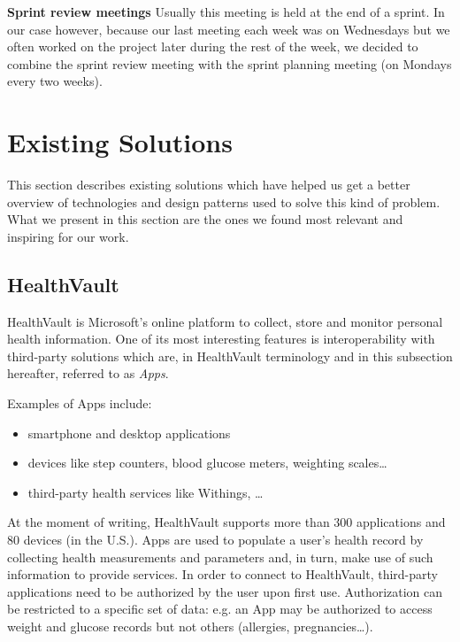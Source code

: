 \textbf{Sprint review meetings}\newline
Usually this meeting is held at the end of a sprint. 
In our case however, because our last meeting each week was on Wednesdays but we often worked on the project later during the rest of the week, we decided to combine the sprint review meeting with the sprint planning meeting (on Mondays every two weeks).


\section{Existing Solutions}
\label{section:existing-solutions}

This section describes existing solutions which have helped us get a better overview of technologies
and design patterns used to solve this kind of problem. 
What we present in this section are the ones we found most relevant and inspiring for our work.


\subsection{HealthVault}

HealthVault is Microsoft's online platform to collect, store and monitor personal health information. %
One of its most interesting features is interoperability with third-party solutions which are, in HealthVault terminology and in this subsection hereafter, referred to as \textit{Apps}.

Examples of Apps include:
\begin{itemize}
\item smartphone and desktop applications
\item devices like step counters, blood glucose meters, weighting scales\ldots
\item third-party health services like Withings, \ldots
\end{itemize}

At the moment of writing, HealthVault supports more than 300 applications and 80 devices (in the U.S.).
Apps are used to populate a user's health record by collecting health measurements and parameters and, in turn, make use of such information to provide services.
In order to connect to HealthVault, third-party applications need to be authorized by the user upon first use. 
Authorization can be restricted to a specific set of data: e.g. an App may be authorized to access weight and glucose records but not others (allergies, pregnancies\ldots).

